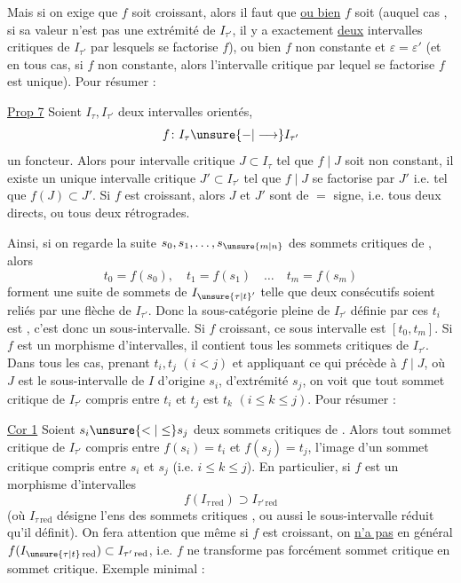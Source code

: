 Mais si on exige que $f$ soit croissant, alors
il faut que \uline{ou bien}  $f$ soit 
(auquel cas , si sa valeur n'est pas une extrémité
de $I_{\tau'}$, il y a exactement \uline{deux} intervalles
critiques de $I_{\tau'}$   par lesquels se factorise $f$),
ou bien $f$ non constante et $\varepsilon=\varepsilon'$ (et en tous cas,
si $f$ non constante, alors l'intervalle critique par
lequel se factorise $f$ est unique). Pour
résumer :

\uline{Prop 7} Soient $I_\tau,I_{\tau'}$ deux intervalles orientés,
\[
 f\colon I_\tau\unsure{\mathbin{-}|\longrightarrow}I_{\tau'}
\]
un foncteur. Alors pour  intervalle critique
$J\subset I_\tau$ tel que $f\mid J$ soit non constant, il existe
un unique intervalle critique $J'\subset I_{\tau'}$ tel que
$f\mid J$ se factorise par $J'$ i.e. tel que $f(J)\subset J'$.
Si $f$ est croissant, alors $J$ et $J'$ sont de $=$ signe,
i.e. tous deux directs, ou tous deux rétrogrades.

Ainsi, si on regarde la suite $s_0,s_1,\ldots,s_{\unsure{m|n}}$
des sommets critiques de , alors 
\[
t_0=f(s_0),\quad t_1=f(s_1)\quad\ldots\quad t_m=f(s_m)
\]
forment une suite de sommets de $I_{\unsure{\tau|t}'}$  telle
que deux consécutifs soient reliés par une flèche
de $I_{\tau'}$. Donc la sous-catégorie pleine de
$I_{\tau'}$ définie par ces $t_i$ est , c'est
donc un sous-intervalle. Si $f$ 
croissant, ce sous intervalle est $[t_0,t_m]$.
 Si $f$ est un morphisme
d'intervalles, il contient tous les sommets
critiques de $I_{\tau'}$. Dans tous les cas, 
prenant $t_i,t_j$ $(i<j)$ et appliquant ce qui précède à $f\mid J$, où $J$ est
le sous-intervalle de $I$ d'origine $s_i$, d'extrémité $s_j$, on voit que tout sommet critique
de $I_{\tau'}$ compris entre $t_i$ et $t_j$ est 
 $t_k$ $(i\leq k\leq j)$. Pour résumer :

\uline{Cor 1} Soient $s_i\unsure{<|\leq}s_j$ deux sommets critiques de
. Alors  tout sommet critique de $I_{\tau'}$
compris entre $f(s_i)=t_i$ et $f(s_j)=t_j$,  
l'image d'un sommet critique  compris entre
$s_i$ et $s_j$ (i.e. $i\leq k\leq j$). En particulier,
si $f$ est un morphisme d'intervalles
\[
f(I_{\tau\,\mathrm{red}})\supset I_{\tau'\,\mathrm{red}}
\]
(où $I_{\tau\,\mathrm{red}}$ désigne l'ens des sommets critiques ,
ou aussi le sous-intervalle réduit qu'il définit).
On fera attention que même si $f$ est croissant,
on \uline{n'a pas} en général $f(I_{\unsure{\tau|t}\,\mathrm{red}})\subset I_{\tau'\,\mathrm{red}}$,
i.e. $f$ ne transforme pas forcément sommet critique
en sommet critique. Exemple minimal :

